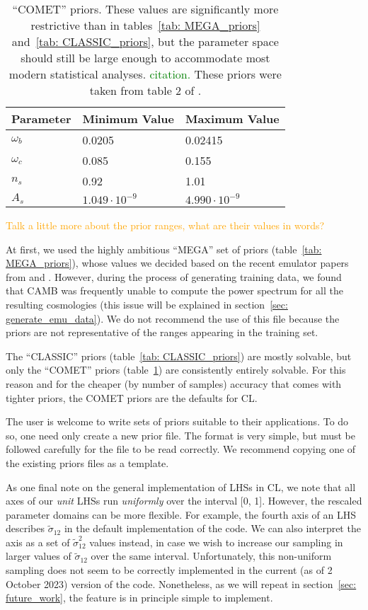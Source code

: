 \begin{table}[ht!]
\centering
\begin{tabular}{l|l|l}
\hline
Parameter & Minimum Value & Maximum Value \\ \hline
$\omega_b$ & 0.0205 & 0.02415 \\
$\omega_c$ & 0.085 & 0.155 \\
$n_s$ & 0.92 & 1.01 \\
$A_s$\footnotemark & $1.049 \cdot 10^{-9}$ & $4.990 \cdot 10^{-9}$  \\
\end{tabular}
	\cprotect\caption[``COMET'' priors]{``COMET'' priors.
	These values are significantly more restrictive than in
	tables~\ref{tab: MEGA_priors} and~\ref{tab: CLASSIC_priors},
	but the parameter space should still be large enough to accommodate
	most modern statistical analyses. \textcolor{green}{citation.}
	These priors were taken from table 2 of \citet{Eggemeier}.}
 \label{tab: COMET_priors}
\end{table}

\textcolor{orange}{Talk a little more about the prior ranges, what are their
values in words?}

At first, we used the highly ambitious ``MEGA'' set of priors
(table~\ref{tab: MEGA_priors}), whose values we decided based on the recent 
emulator papers from \citet{Mancini} and \citet{Arico}.
However, during the process of generating training data, 
we found that CAMB was frequently unable to compute the power spectrum for
all the
resulting cosmologies (this issue will be explained in
section~\ref{sec: generate_emu_data}). We do not recommend the use of this
file because the priors are not representative of the ranges appearing in the
training set.

The ``CLASSIC'' priors (table~\ref{tab: CLASSIC_priors}) are mostly solvable, 
but only the ``COMET'' priors (table~\ref{tab: COMET_priors}) are consistently
entirely solvable. For this reason and for the cheaper (by number of samples) 
accuracy that comes with tighter priors, the COMET priors are the defaults for 
CL.

The user is welcome to write sets of priors suitable to their applications.
To do so, one need only create a new prior file. The format is very simple, 
but must be followed carefully for the file to be read correctly. We
recommend copying one of the existing priors files as a template. 

As one final note on the general implementation of LHSs in CL, we note that
all axes of our \textit{unit} LHSs run \textit{uniformly} over the interval
[0, 1]. However, the rescaled 
parameter domains can be more flexible. For example, the fourth axis
of an LHS
describes $\tilde{\sigma}_{12}$ in the default implementation of the code. We can also
interpret the axis as a set of $\tilde{\sigma}_{12}^2$ values instead,
in case we wish to
increase our sampling in larger values of $\tilde{\sigma}_{12}$ over the same
interval. Unfortunately, this non-uniform sampling does not seem to be
correctly implemented
in the current (as of 2 October 2023) version of the code. Nonetheless, as we
will repeat in section~\ref{sec: future_work},
the feature is in principle simple to implement.


